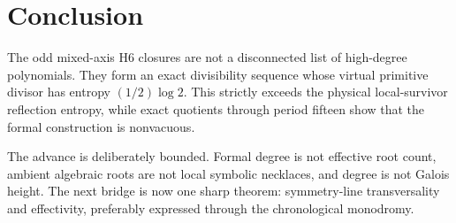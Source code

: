 \section{Conclusion}

The odd mixed-axis H6 closures are not a disconnected list of high-degree
polynomials.  They form an exact divisibility sequence whose virtual
primitive divisor has entropy $(1/2)\log2$.  This strictly exceeds the
physical local-survivor reflection entropy, while exact quotients through
period fifteen show that the formal construction is nonvacuous.

The advance is deliberately bounded.  Formal degree is not effective root
count, ambient algebraic roots are not local symbolic necklaces, and degree
is not Galois height.  The next bridge is now one sharp theorem:
symmetry-line transversality and effectivity, preferably expressed through
the chronological monodromy.
